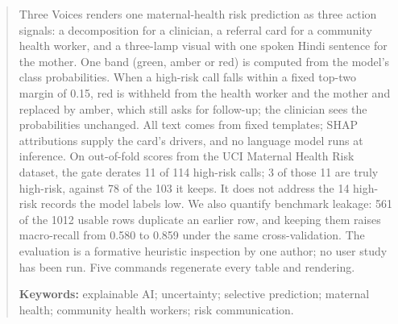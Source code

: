 \begin{abstract}
\noindent Three Voices renders one maternal-health risk prediction as three
action signals: a decomposition for a clinician, a referral card for a
community health worker, and a three-lamp visual with one spoken Hindi
sentence for the mother. One band (green, amber or red) is computed from the
model's class probabilities. When a high-risk call falls within a fixed
top-two margin of 0.15, red is withheld from the health worker and the mother
and replaced by amber, which still asks for follow-up; the clinician sees the
probabilities unchanged. All text comes from fixed templates; SHAP
attributions supply the card's drivers, and no language model runs at
inference. On out-of-fold
scores from the UCI Maternal Health Risk dataset, the gate derates 11 of 114
high-risk calls; 3 of those 11 are truly high-risk, against 78 of the 103 it
keeps. It does not address the 14 high-risk records the model labels low. We
also quantify benchmark leakage: 561 of the 1012 usable rows duplicate an
earlier row, and keeping them raises macro-recall from 0.580 to 0.859 under
the same cross-validation. The evaluation is a formative heuristic inspection
by one author; no user study has been run. Five commands regenerate every
table and rendering.

\medskip

\noindent\textbf{Keywords:} explainable AI; uncertainty; selective
prediction; maternal health; community health workers; risk communication.
\end{abstract}
